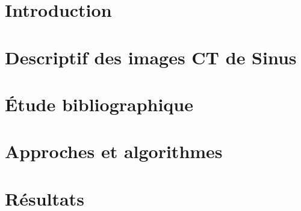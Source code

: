 \documentclass[a4paper,12pt,twoside]{report}
\begin{document}
%

\newpage

\renewcommand{\contentsname}{\textsc{Sommaire}}
\tableofcontents

%


\chapter*{Introduction}
          
\chapter{Descriptif des images CT de Sinus}
\label{desc_img}
		 
\chapter{Étude bibliographique}
         

\chapter{Approches et algorithmes}
		
\chapter{Résultats}
          

\end{document}
